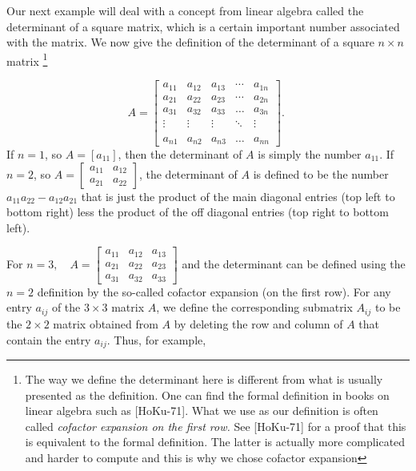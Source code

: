 \documentclass[../main.tex]{subfiles}
\begin{document}
Our next example will deal with a concept from linear algebra called the determinant of a square matrix, which is a certain important number associated with the matrix. We now give the definition of the determinant of a square $n \times n$ matrix \footnote[4]{The way we define the determinant here is different from what is usually presented as the definition. One can find the formal definition in books on linear algebra such as [HoKu-71]. What we use as our definition is often called \emph{cofactor expansion on the first row.} See [HoKu-71] for a proof that this is equivalent to the formal definition. The latter is actually more complicated and harder to compute and this is why we chose cofactor expansion}

$$
A=\left[\begin{array}{ccccc}
a_{11} & a_{12} & a_{13} & \cdots & a_{1 n} \\
a_{21} & a_{22} & a_{23} & \cdots & a_{2 n} \\
a_{31} & a_{32} & a_{33} & \ldots & a_{3 n} \\
\vdots & \vdots & \vdots & \ddots & \vdots \\
& & & & \\
a_{n 1} & a_{n 2} & a_{n 3} & \ldots & a_{n n}
\end{array}\right] \text {. }
$$
If $n=1$, so $A=\left[a_{11}\right]$, then the determinant of $A$ is simply the number $a_{11}$. If $n=2$, so $A=\left[\begin{array}{ll}a_{11} & a_{12} \\ a_{21} & a_{22}\end{array}\right]$, the determinant of $A$ is defined to be the number $a_{11} a_{22}-a_{12} a_{21}$ that is just the product of the main diagonal entries (top left to bottom right) less the product of the off diagonal entries (top right to bottom left).

For $n=3, \quad A=\left[\begin{array}{lll}a_{11} & a_{12} & a_{13} \\ a_{21} & a_{22} & a_{23} \\ a_{31} & a_{32} & a_{33}\end{array}\right]$ and the determinant can be defined using the $n=2$ definition by the so-called cofactor expansion (on the first row). For any entry $a_{i j}$ of the $3 \times 3$ matrix $A$, we define the corresponding submatrix $A_{i j}$ to be the $2 \times 2$ matrix obtained from $A$ by deleting the row and column of $A$ that contain the entry $a_{i j}$. Thus, for example,
\end{document}
